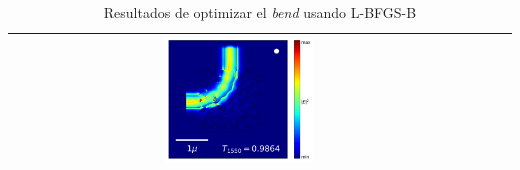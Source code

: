 \begin{table}[H]
\begin{tabular}{|c|c|c|c|}
      \includegraphics[width=0.33\textwidth]{image/results/bend/L-BFGS-B/visualize_field_fab_512.png} \\
    \hline
    \end{tabular}
    \hspace*{-3cm}
    \caption{Resultados de optimizar el \emph{bend} usando L-BFGS-B}
    \label{tab:opt-LBFGSB-bend}
\end{table}

